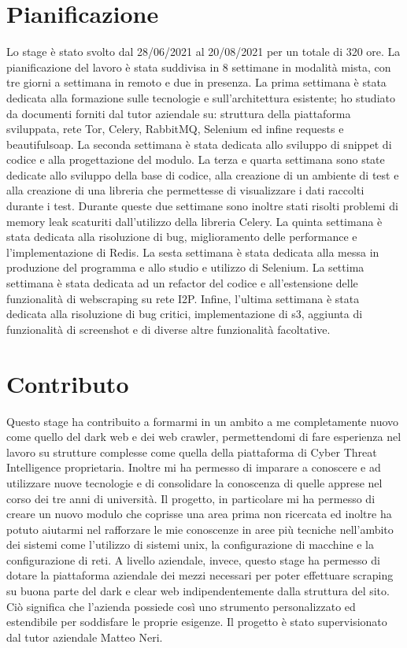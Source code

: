 \section{Pianificazione}
Lo stage è stato svolto dal 28/06/2021 al 20/08/2021 per un totale di 320 ore. La pianificazione del lavoro è stata suddivisa in 8 settimane in modalità mista, con tre giorni a settimana in remoto e due in presenza. La prima settimana è stata dedicata alla formazione sulle tecnologie e sull'architettura esistente; ho studiato da documenti forniti dal tutor aziendale su: struttura della piattaforma sviluppata, rete Tor, Celery, RabbitMQ, Selenium ed infine requests e beautifulsoap.\newline{}
La seconda settimana è stata dedicata allo sviluppo di snippet di codice e alla progettazione del modulo. \newline{}
La terza e quarta settimana sono state dedicate allo sviluppo della base di codice, alla creazione di un ambiente di test e alla creazione di una libreria che permettesse di visualizzare i dati raccolti durante i test. Durante queste due settimane sono inoltre stati risolti problemi di memory leak scaturiti dall'utilizzo della libreria Celery.
La quinta settimana è stata dedicata alla risoluzione di bug, miglioramento delle performance e l'implementazione di Redis.
La sesta settimana è stata dedicata alla messa in produzione del programma e allo studio e utilizzo di Selenium.
La settima settimana è stata dedicata ad un refactor del codice e all'estensione delle funzionalità di webscraping su rete I2P.
Infine, l'ultima settimana è stata dedicata alla risoluzione di bug critici, implementazione di s3, aggiunta di funzionalità di screenshot e di diverse altre funzionalità facoltative.


\section{Contributo}
Questo stage ha contribuito a formarmi in un ambito a me completamente nuovo come quello del dark web e dei web crawler, permettendomi di fare esperienza nel lavoro su strutture complesse come quella della piattaforma di Cyber Threat Intelligence proprietaria. Inoltre mi ha permesso di imparare a conoscere e ad utilizzare nuove tecnologie e di consolidare la conoscenza di quelle apprese nel corso dei tre anni di università.
Il progetto, in particolare mi ha permesso di creare un nuovo modulo che coprisse una area prima non ricercata ed inoltre ha potuto aiutarmi nel rafforzare le mie conoscenze in aree più tecniche nell'ambito dei sistemi come l'utilizzo di sistemi unix, la configurazione di macchine e la configurazione di reti.
A livello aziendale, invece, questo stage ha permesso di dotare la piattaforma aziendale dei mezzi necessari per poter effettuare scraping su buona parte del dark e clear web indipendentemente dalla struttura del sito. Ciò significa che l’azienda possiede così uno strumento personalizzato ed estendibile per soddisfare le proprie esigenze. \newline{}
Il progetto è stato supervisionato dal tutor aziendale Matteo Neri.

